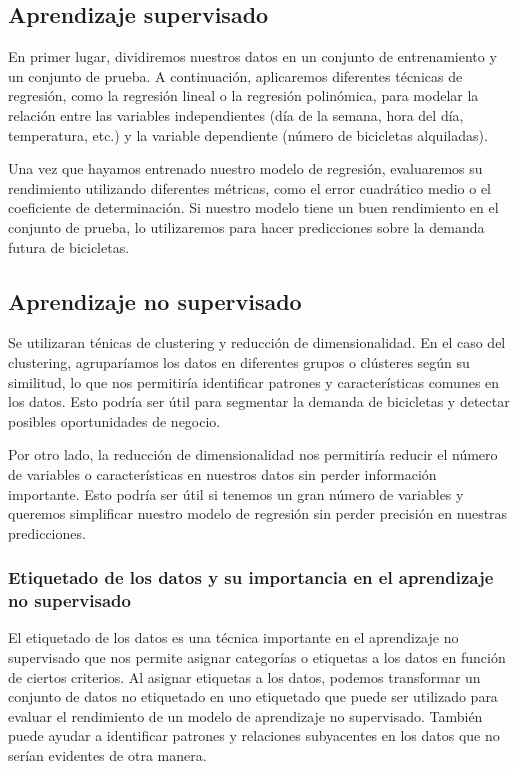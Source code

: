 \documentclass{wsdcr}
\begin{document}
\subsection{Aprendizaje supervisado}
En primer lugar, dividiremos nuestros datos en un conjunto de entrenamiento y un conjunto de prueba. A continuación, aplicaremos diferentes técnicas de regresión, como la regresión lineal o la regresión polinómica, para modelar la relación entre las variables independientes (día de la semana, hora del día, temperatura, etc.) y la variable dependiente (número de bicicletas alquiladas).

Una vez que hayamos entrenado nuestro modelo de regresión, evaluaremos su rendimiento utilizando diferentes métricas, como el error cuadrático medio o el coeficiente de determinación. Si nuestro modelo tiene un buen rendimiento en el conjunto de prueba, lo utilizaremos para hacer predicciones sobre la demanda futura de bicicletas.

\subsection{Aprendizaje no supervisado}
Se utilizaran ténicas de clustering y reducción de dimensionalidad.
En el caso del clustering, agruparíamos los datos en diferentes grupos o clústeres según su similitud, lo que nos permitiría identificar patrones y características comunes en los datos. Esto podría ser útil para segmentar la demanda de bicicletas y detectar posibles oportunidades de negocio.

Por otro lado, la reducción de dimensionalidad nos permitiría reducir el número de variables o características en nuestros datos sin perder información importante. Esto podría ser útil si tenemos un gran número de variables y queremos simplificar nuestro modelo de regresión sin perder precisión en nuestras predicciones.
\subsubsection{Etiquetado de los datos y su importancia en el aprendizaje no supervisado}

El etiquetado de los datos es una técnica importante en el aprendizaje no supervisado que nos permite asignar categorías o etiquetas a los datos en función de ciertos criterios. Al asignar etiquetas a los datos, podemos transformar un conjunto de datos no etiquetado en uno etiquetado que puede ser utilizado para evaluar el rendimiento de un modelo de aprendizaje no supervisado. También puede ayudar a identificar patrones y relaciones subyacentes en los datos que no serían evidentes de otra manera.
\end{document}
